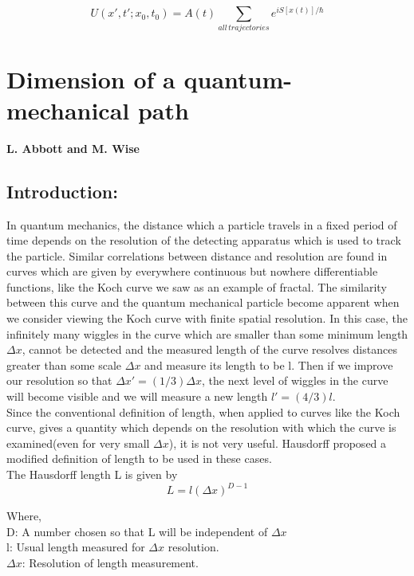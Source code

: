 \documentclass[14pt]{extarticle}
\begin{document}
$$U(x',t';x_0,t_0) = A(t) \sum_{all \, trajectories} e^{iS[x(t)]/\hbar}$$

\newpage

\section{Dimension of a quantum-mechanical path}
 \textbf{L. Abbott and M. Wise}
 
 \subsection{Introduction:}
 
 In quantum mechanics, the distance which a particle travels in a fixed period of time depends on the resolution of the detecting apparatus which is used to track the particle. Similar correlations between distance and resolution are found in curves which are given by everywhere continuous but nowhere differentiable functions, like the Koch curve we saw as an example of fractal. The similarity between this curve and the quantum mechanical particle become apparent when we consider viewing the Koch curve with finite spatial resolution. In this case, the infinitely many wiggles in the curve which are smaller than some minimum length $\Delta x$, cannot be detected and the measured length of the curve resolves distances greater than some scale $\Delta x$ and measure its length to be l. Then if we improve our resolution so that $\Delta x'=(1/3) \Delta x$, the next level of wiggles in the curve will become visible and we will measure a new length $l'=(4/3)l$.\\
 Since the conventional definition of length, when applied to curves like the Koch curve, gives a quantity which depends on the resolution with which the curve is examined(even for very small 
$ \Delta x$), it is not very useful. Hausdorff proposed a modified definition of length to be used in these cases.\\

The Hausdorff length L is given by 
$$L=l(\Delta x)^{D-1}$$

Where, \\
D:\hspace{7mm}  A number chosen so that L will be independent of $\Delta x$\\
 l:\hspace{10mm} Usual length measured for $\Delta x$ resolution.\\
$\Delta x$:\hspace{5mm} Resolution of length measurement.\\
\end{document}
